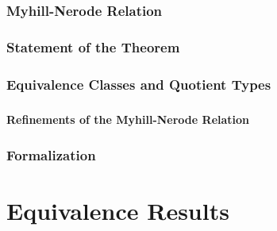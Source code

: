 \documentclass[11pt,a4paper,oneside]{book}
\begin{document}
            \subsection{Myhill-Nerode Relation}

                \paragraph{}
        
            \subsection{Statement of the Theorem}

                \paragraph{}

            \subsection{Equivalence Classes and Quotient Types}

                \paragraph{}

            \subsubsection{Refinements of the Myhill-Nerode Relation}

                \paragraph{}

            \subsection{Formalization}

                \paragraph{}


    \chapter{Equivalence Results}
\end{document}
